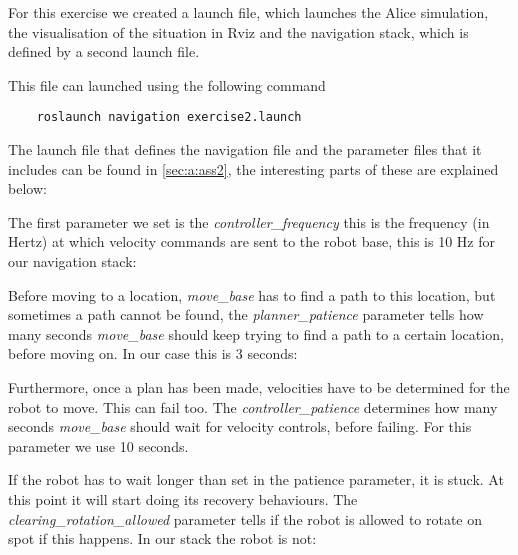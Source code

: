 
For this exercise we created a launch file, which launches the Alice simulation, the visualisation of the situation in Rviz and the navigation stack, which is defined by a second launch file.



This file can launched using the following command

\begin{lstlisting}
	roslaunch navigation exercise2.launch
\end{lstlisting}

The launch file that defines the navigation file and the parameter files that it includes can be found in \cref{sec:a:ass2}, the interesting parts of these are explained below:

The first parameter we set is the \emph{controller\_frequency} this is the frequency (in Hertz) at which velocity commands are sent to the robot base, this is 10 Hz for our navigation stack:



Before moving to a location, \emph{move\_base} has to find a path to this location, but sometimes a path cannot be found, the \emph{planner\_patience} parameter tells how many seconds \emph{move\_base} should keep trying to find a path to a certain location, before moving on. In our case this is 3 seconds:



Furthermore, once a plan has been made, velocities have to be determined for the robot to move. This can fail too. The \emph{controller\_patience} determines how many seconds \emph{move\_base} should wait for velocity controls, before failing. For this parameter we use 10 seconds.



If the robot has to wait longer than set in the patience parameter, it is stuck. At this point it will start doing its recovery behaviours. The \emph{clearing\_rotation\_allowed} parameter tells if the robot is allowed to rotate on spot if this happens. In our stack the robot is not:

